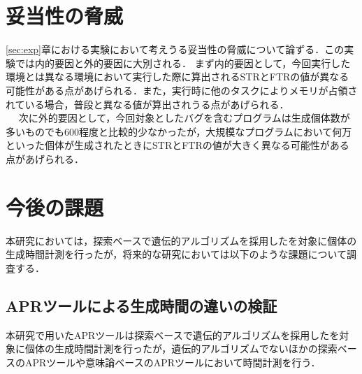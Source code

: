 \documentclass[uplatex,dvipdfmx,a4paper]{jsarticle}
\begin{document}
\clearpage
\section{妥当性の脅威}\label{sec:threat}
\ref{sec:exp}章における実験において考えうる妥当性の脅威について論ずる．この実験では内的要因と外的要因に大別される．
まず内的要因として，今回実行した環境とは異なる環境において実行した際に算出されるSTRとFTRの値が異なる可能性がある点があげられる．また，実行時に他のタスクによりメモリが占領されている場合，普段と異なる値が算出されうる点があげられる．\\　
次に外的要因として，今回対象としたバグを含むプログラムは生成個体数が多いものでも600程度と比較的少なかったが，大規模なプログラムにおいて何万といった個体が生成されたときにSTRとFTRの値が大きく異なる可能性がある点があげられる．
\clearpage
\section{今後の課題}\label{sec:ftrclg}
本研究においては，探索ベースで遺伝的アルゴリズムを採用した\kgp を対象に個体の生成時間計測を行ったが，将来的な研究においては以下のような課題について調査する．
\subsection{APRツールによる生成時間の違いの検証}
本研究で用いたAPRツールは探索ベースで遺伝的アルゴリズムを採用した\kgp を対象に個体の生成時間計測を行ったが，遺伝的アルゴリズムでないほかの探索ベースのAPRツールや意味論ベースのAPRツールにおいて時間計測を行う．
\end{document}
